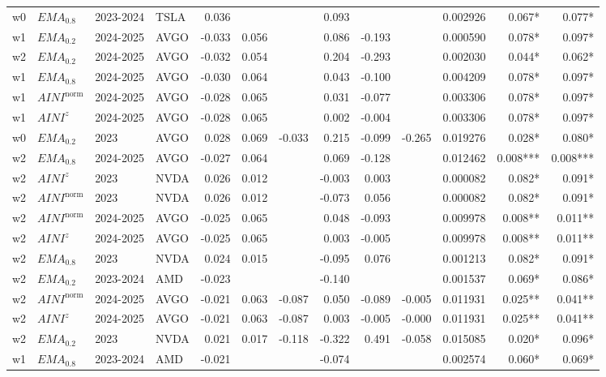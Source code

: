 \begin{longtable}{@{}llllrrrrrrrrr@{}}
w0 & $EMA_{0.8}$ & 2023-2024 & TSLA & 0.036 &  &  & 0.093 &  &  & 0.002926 & 0.067* & 0.077* \\
w1 & $EMA_{0.2}$ & 2024-2025 & AVGO & -0.033 & 0.056 &  & 0.086 & -0.193 &  & 0.000590 & 0.078* & 0.097* \\
w2 & $EMA_{0.2}$ & 2024-2025 & AVGO & -0.032 & 0.054 &  & 0.204 & -0.293 &  & 0.002030 & 0.044* & 0.062* \\
w1 & $EMA_{0.8}$ & 2024-2025 & AVGO & -0.030 & 0.064 &  & 0.043 & -0.100 &  & 0.004209 & 0.078* & 0.097* \\
w1 & $AINI^{\mathrm{norm}}$ & 2024-2025 & AVGO & -0.028 & 0.065 &  & 0.031 & -0.077 &  & 0.003306 & 0.078* & 0.097* \\
w1 & $AINI^{z}$ & 2024-2025 & AVGO & -0.028 & 0.065 &  & 0.002 & -0.004 &  & 0.003306 & 0.078* & 0.097* \\
w0 & $EMA_{0.2}$ & 2023 & AVGO & 0.028 & 0.069 & -0.033 & 0.215 & -0.099 & -0.265 & 0.019276 & 0.028* & 0.080* \\
w2 & $EMA_{0.8}$ & 2024-2025 & AVGO & -0.027 & 0.064 &  & 0.069 & -0.128 &  & 0.012462 & 0.008*** & 0.008*** \\
w2 & $AINI^{z}$ & 2023 & NVDA & 0.026 & 0.012 &  & -0.003 & 0.003 &  & 0.000082 & 0.082* & 0.091* \\
w2 & $AINI^{\mathrm{norm}}$ & 2023 & NVDA & 0.026 & 0.012 &  & -0.073 & 0.056 &  & 0.000082 & 0.082* & 0.091* \\
w2 & $AINI^{\mathrm{norm}}$ & 2024-2025 & AVGO & -0.025 & 0.065 &  & 0.048 & -0.093 &  & 0.009978 & 0.008** & 0.011** \\
w2 & $AINI^{z}$ & 2024-2025 & AVGO & -0.025 & 0.065 &  & 0.003 & -0.005 &  & 0.009978 & 0.008** & 0.011** \\
w2 & $EMA_{0.8}$ & 2023 & NVDA & 0.024 & 0.015 &  & -0.095 & 0.076 &  & 0.001213 & 0.082* & 0.091* \\
w2 & $EMA_{0.2}$ & 2023-2024 & AMD & -0.023 &  &  & -0.140 &  &  & 0.001537 & 0.069* & 0.086* \\
w2 & $AINI^{\mathrm{norm}}$ & 2024-2025 & AVGO & -0.021 & 0.063 & -0.087 & 0.050 & -0.089 & -0.005 & 0.011931 & 0.025** & 0.041** \\
w2 & $AINI^{z}$ & 2024-2025 & AVGO & -0.021 & 0.063 & -0.087 & 0.003 & -0.005 & -0.000 & 0.011931 & 0.025** & 0.041** \\
w2 & $EMA_{0.2}$ & 2023 & NVDA & 0.021 & 0.017 & -0.118 & -0.322 & 0.491 & -0.058 & 0.015085 & 0.020* & 0.096* \\
w1 & $EMA_{0.8}$ & 2023-2024 & AMD & -0.021 &  &  & -0.074 &  &  & 0.002574 & 0.060* & 0.069* \\

\end{longtable}

